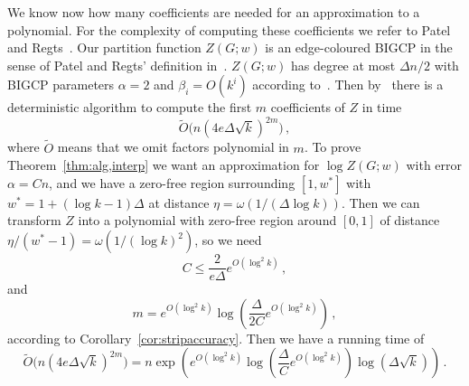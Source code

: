 %
%
We know now how many coefficients are needed for an approximation to a polynomial. 
For the complexity of computing these coefficients we refer to Patel and Regts~\cite{PR17,PR19}.
Our partition function $Z(G;w)$ is an edge-coloured BIGCP in the sense of Patel and Regts' definition in~\cite{PR19}.
$Z(G;w)$ has degree at most $\Delta n/2$ with BIGCP parameters $\alpha=2$ and $\beta_i=O(k^i)$ according to~\cite[Section 6]{PR17}.
Then by~\cite[Theorem 2.1]{PR19} there is a deterministic algorithm to compute the first $m$ coefficients of $Z$ in time
\[
\tilde O\big(n(4e\Delta\sqrt k)^{2m}\big)\,,
\]
where $\tilde O$ means that we omit factors polynomial in $m$.
%
To prove Theorem~\ref{thm:alg,interp} we want an approximation for $\log Z(G;w)$ with error $\alpha=C n$, and we have a zero-free region surrounding $[1,w^*]$ with $w^*=1+(\log k-1)\Delta$ at distance $\eta=\omega(1/(\Delta\log k))$. 
Then we can transform $Z$ into a polynomial with zero-free region around $[0,1]$ of distance $\eta/(w^*-1) = \omega(1/(\log k)^2)$, so we need
\[
C  \le \frac{2}{e\Delta}e^{O(\log^2 k)} \,,
\]
and
\[
m = e^{O(\log^2 k)}\log\left(\frac{\Delta}{2C}e^{O(\log^2 k)}\right)\,,
\]
according to Corollary~\ref{cor:stripaccuracy}.
%
Then we have a running time of
\[
\tilde O\big(n(4e\Delta\sqrt k)^{2m}\big)
= n\exp\left(e^{O(\log^2 k)} \log\left(\frac{\Delta}{C}e^{O(\log^2 k)}\right)\log(\Delta\sqrt k)\right)\,.
\]
%
